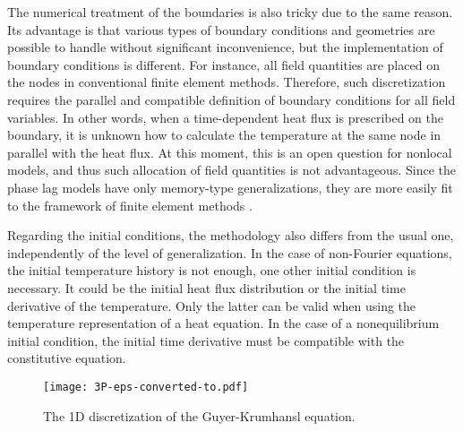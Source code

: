 \documentclass[sn-mathphys]{sn-jnl}%
\theoremstyle{thmstyleone}%
\theoremstyle{thmstyletwo}%
\theoremstyle{thmstylethree}%
\begin{document}
{{The numerical treatment of the boundaries is also tricky due to the same reason. Its advantage is that various types of boundary conditions and geometries are possible to handle without significant inconvenience, but the implementation of boundary conditions is different. For instance, all field quantities are placed on the nodes in conventional finite element methods. Therefore, such discretization requires the parallel and compatible definition of boundary conditions for all field variables. In other words, when a time-dependent heat flux is prescribed on the boundary, it is unknown how to calculate the temperature at the same node in parallel with the heat flux. At this moment, this is an open question for nonlocal models, and thus such allocation of field quantities is not advantageous. Since the phase lag models have only memory-type generalizations, they are more easily fit to the framework of finite element methods \cite{ManMan99, XuLi03, BarSte05a, BarSte08, RahEtal12, VishEtal11, BargFav14}.

Regarding the initial conditions, the methodology also differs from the usual one, independently of the level of generalization. In the case of non-Fourier equations, the initial temperature history is not enough, one other initial condition is necessary. It could be the initial heat flux distribution or the initial time derivative of the temperature. Only the latter can be valid when using the temperature representation of a heat equation. In the case of a nonequilibrium initial condition, the initial time derivative must be compatible with the constitutive equation.}

\begin{figure}
	\label{GK1Ddisc}
	\centering
	\texttt{[image: 3P-eps-converted-to.pdf]}
	\caption{The 1D discretization of the Guyer-Krumhansl equation.}
\end{figure}

}
\end{document}
